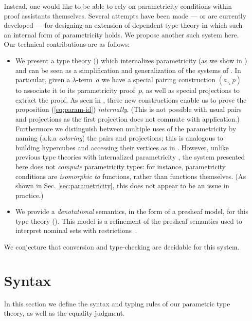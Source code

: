 \documentclass[english]{PaperTools/latex/entcs}
\theoremstyle{plain}
\theoremstyle{definition}
\theoremstyle{remark}
\newcommand\CP[3]{(#2,_{#1} #3)}
\begin{document}
Instead, one would like to be able to rely on parametricity conditions
within proof assistants themselves.  Several attempts have been made
\citep{bernardy_computational_2012,bernardy_type-theory_2013} --- or are currently
developed \citep{altenkirch2014syntax} ---
for designing an extension of dependent type theory in which such an internal form of
parametricity holds. We propose another such system here.
Our technical contributions are as follows:
\begin{itemize}
\item We present a type theory () which internalizes parametricity (as we show in )
  and can be seen as a simplification and generalization of the systems of
  \citet{bernardy_computational_2012,bernardy_type-theory_2013}.
  In particular, given a $λ$-term~$a$ we have a special pairing construction
  $\CP i a p$ to associate it to its parametricity proof~$p$, as well as special
  projections to extract the proof. As seen in , these
  new constructions enable us to prove the proposition (\ref{eq:param-id})
  \emph{internally}.  (This is not possible with usual pairs and
  projections as the first projection does not commute with
  application.)  Furthermore we distinguish between multiple uses of the
  parametricity by naming (a.k.a \emph{coloring}) the pairs and
  projections; this is analogous to building hypercubes and accessing
  their vertices as in \citep{bernardy_computational_2012}.
  However, unlike previous type theories with internalized parametricity
  \citep{bernardy_computational_2012, bernardy_type-theory_2013}, the
  system presented here does not \emph{compute} parametricity types:
  for instance, parametricity conditions are \emph{isomorphic to}
  functions, rather than functions themselves.  (As shown in
  Sec. \ref{sec:parametricity}, this does not appear to be an issue in
  practice.)
\item We provide a \emph{denotational} semantics, in the form of a presheaf model, for this type theory ().
      This model is a refinement of the presheaf semantics used to
      interpret nominal sets with
      restrictions~\citep{bezem2014model,DBLP:journals/corr/Pitts14}.
\end{itemize}
We conjecture that conversion and type-checking are decidable for this system.

\section{Syntax}
\label{sec:syntax}
In this section we define the syntax and typing rules of our
parametric type theory, as well as the equality judgment.
\end{document}
